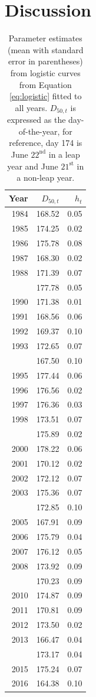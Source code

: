 \documentclass[12pt,]{book}
\theoremstyle{definition}
\theoremstyle{definition}
\theoremstyle{definition}
\theoremstyle{remark}
\begin{document}
\section{Discussion}\label{discussion}

\begin{singlespace}

\begin{table}

\caption{\label{tab:rt-ests-table}Parameter estimates (mean with standard error in parentheses) from logistic curves from Equation \ref{eq:logistic} fitted to all years. $D_{50,t}$ is expressed as the day-of-the-year, for reference, day 174 is June $22^{\text{nd}}$ in a leap year and June $21^{\text{st}}$ in a non-leap year.}
\centering
\begin{tabular}[t]{rrr}
\toprule
Year & $D_{50,t}$ & $h_t$\\
\midrule
1984 & 168.52 & 0.05\\
1985 & 174.25 & 0.02\\
1986 & 175.78 & 0.08\\
1987 & 168.30 & 0.02\\
1988 & 171.39 & 0.07\\
\addlinespace
1989 & 177.78 & 0.05\\
1990 & 171.38 & 0.01\\
1991 & 168.56 & 0.06\\
1992 & 169.37 & 0.10\\
1993 & 172.65 & 0.07\\
\addlinespace
1994 & 167.50 & 0.10\\
1995 & 177.44 & 0.06\\
1996 & 176.56 & 0.02\\
1997 & 176.36 & 0.03\\
1998 & 173.51 & 0.07\\
\addlinespace
1999 & 175.89 & 0.02\\
2000 & 178.22 & 0.06\\
2001 & 170.12 & 0.02\\
2002 & 172.12 & 0.07\\
2003 & 175.36 & 0.07\\
\addlinespace
2004 & 172.85 & 0.10\\
2005 & 167.91 & 0.09\\
2006 & 175.79 & 0.04\\
2007 & 176.12 & 0.05\\
2008 & 173.92 & 0.09\\
\addlinespace
2009 & 170.23 & 0.09\\
2010 & 174.87 & 0.09\\
2011 & 170.81 & 0.09\\
2012 & 173.50 & 0.02\\
2013 & 166.47 & 0.04\\
\addlinespace
2014 & 173.17 & 0.04\\
2015 & 175.24 & 0.07\\
2016 & 164.38 & 0.10\\
\bottomrule
\end{tabular}
\end{table}

\end{singlespace}
\end{document}
